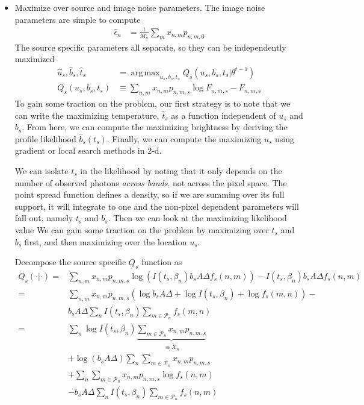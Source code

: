 \documentclass[11pt]{article}
\DeclareMathOperator*{\argmax}{arg\,max}
\begin{document}
\begin{itemize}
\item Maximize over source and image noise parameters.  The image noise parameters are simple to compute
\begin{align}
  \hat \epsilon_n &= \frac{1}{M_n} \sum_{m} x_{n,m} p_{n,m,0}
\end{align}
The source specific parameters all separate, so they can be independently maximized
\begin{align}
  \hat u_s, \hat b_s, \hat t_s &= \argmax_{u_s, b_s, t_s} Q_s(u_s, b_s, t_s | \theta^{t-1}) \\
  Q_s(u_s, b_s, t_s) &\equiv \sum_{n,m} x_{n,m} p_{n,m,s} \log F_{n,m,s} - F_{n,m,s}
\end{align}
To gain some traction on the problem, our first strategy is to note that we can write the maximizing temperature, $\hat t_s$ as a function independent of $u_s$ and $b_s$.  From here, we can compute the maximizing brightness by deriving the profile likelihood $\hat b_s(t_s)$.  Finally, we can compute the maximizing $u_s$ using gradient or local search methods in 2-d.  

We can isolate $t_s$ in the likelihood by noting that it only depends on the number of observed photons \emph{across bands}, not across the pixel space. The point spread function defines a density, so if we are summing over its full support, it will integrate to one and the non-pixel dependent parameters will fall out, namely $t_s$ and $b_s$.  Then we can look at the maximizing likelihood value We can gain some traction on the problem by maximizing over $t_s$ and $b_s$ first, and then maximizing over the location $u_s$.  

Decompose the source specific $Q_s$ function as 
\begin{align*}
Q_s(\cdot | \cdot) 
  =& \sum_{n,m} x_{n,m} p_{n,m,s} \log\left(I(t_s,\beta_n) b_s A \Delta f_s(n,m) \right) - I(t_s,\beta_n) b_s A \Delta f_s(n,m)\\
  =& \sum_{n,m} x_{n,m} p_{n,m,s} \left(\log b_s A \Delta + \log I(t_s, \beta_n) + \log f_s(m,n) \right) - \\
   & b_s A \Delta \sum_{n} I(t_s, \beta_n) \sum_{m \in \mathcal{P}_n} f_s(m,n) \\
  =& \sum_{n} \log I(t_s, \beta_n) \underbrace{\sum_{m \in \mathcal{P}_n} x_{n,m} p_{n,m,s}}_{\equiv \tilde X_n} \\
   & + \log (b_s A \Delta) \sum_{n} \sum_{m \in \mathcal{P}_n} x_{n,m} p_{n,m,s} \\
   & + \sum_{n} \sum_{m \in \mathcal{P}_n} x_{n,m} p_{n,m,s} \log f_s(n,m) \\
   & - b_s A \Delta \sum_{n} I(t_s, \beta_n) \sum_{m \in \mathcal{P}_n} f_s(n,m)
\end{align*}


\end{itemize}
\end{document}
